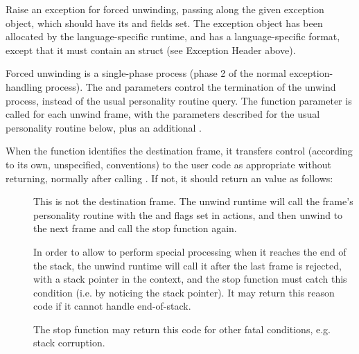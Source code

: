 
Raise an exception for forced unwinding, passing along the given
exception object, which should have its  and
 fields set. The exception object has been allocated
by the language-specific runtime, and has a language-specific format,
except that it must contain an  struct (see Exception
Header above).

Forced unwinding is a single-phase process (phase 2 of the normal
exception-handling process). The  and
 parameters control the termination of the
unwind process, instead of the usual personality routine query. The
 function parameter is called for each unwind frame, with
the parameters described for the usual personality routine below, plus
an additional .

When the  function identifies the destination frame, it
transfers control (according to its own, unspecified, conventions)
to the user code as appropriate without returning, normally after
calling . If not, it should return an
 value as follows:

\begin{description}
\item[]
     This is not the destination frame. The unwind
     runtime will call the frame's personality routine with the
      and  flags set in actions,
     and then unwind to the next frame and call the stop function again.

\item[] In order to allow 
     to perform special processing when it reaches the end of the stack,
     the unwind runtime will call it after the last frame is rejected,
     with a  stack pointer in the context, and the stop function must
     catch this condition (i.e. by noticing the  stack pointer).
     It may return this reason code if it cannot handle end-of-stack.

\item[] The stop function may return this code
     for other fatal conditions, e.g. stack corruption.
\end{description}

